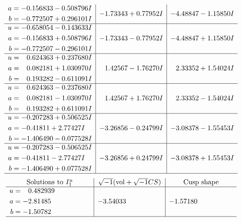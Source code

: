 \documentclass[1p]{elsarticle_modified}
\theoremstyle{definition}
\newcommand{\I}{\sqrt{-1}}
\begin{document}
$$\begin{array}{c|c|c}
\begin{aligned}
a &= -0.156833 - 0.508796 I \\
b &= -0.772507 + 0.296101 I\end{aligned}
 & -1.73343 + 0.77952 I & -4.48847 - 1.15850 I \\ \hline\begin{aligned}
u &= -0.658054 - 0.143633 I \\
a &= -0.156833 + 0.508796 I \\
b &= -0.772507 - 0.296101 I\end{aligned}
 & -1.73343 - 0.77952 I & -4.48847 + 1.15850 I \\ \hline\begin{aligned}
u &= \phantom{-}0.624363 + 0.237680 I \\
a &= \phantom{-}0.082181 + 1.030970 I \\
b &= \phantom{-}0.193282 - 0.611091 I\end{aligned}
 & \phantom{-}1.42567 - 1.76270 I & \phantom{-}2.33352 + 1.54024 I \\ \hline\begin{aligned}
u &= \phantom{-}0.624363 - 0.237680 I \\
a &= \phantom{-}0.082181 - 1.030970 I \\
b &= \phantom{-}0.193282 + 0.611091 I\end{aligned}
 & \phantom{-}1.42567 + 1.76270 I & \phantom{-}2.33352 - 1.54024 I \\ \hline\begin{aligned}
u &= -0.207283 + 0.506525 I \\
a &= -0.41811 + 2.77427 I \\
b &= -1.406490 - 0.077528 I\end{aligned}
 & -3.26856 - 0.24799 I & -3.08378 - 1.55453 I \\ \hline\begin{aligned}
u &= -0.207283 - 0.506525 I \\
a &= -0.41811 - 2.77427 I \\
b &= -1.406490 + 0.077528 I\end{aligned}
 & -3.26856 + 0.24799 I & -3.08378 + 1.55453 I\\
 \hline 
 \end{array}$$\newpage$$\begin{array}{c|c|c}  
\text{Solutions to }I^u_{1}& \I (\text{vol} + \sqrt{-1}CS) & \text{Cusp shape}\\
 \hline 
\begin{aligned}
u &= \phantom{-}0.482939\phantom{ +0.000000I} \\
a &= -2.81485\phantom{ +0.000000I} \\
b &= -1.50782\phantom{ +0.000000I}\end{aligned}
 & -3.54033\phantom{ +0.000000I} & -1.57180\phantom{ +0.000000I}\\
 \hline 
 \end{array}$$\newpage\newpage\renewcommand{\arraystretch}{1}
\end{document}
